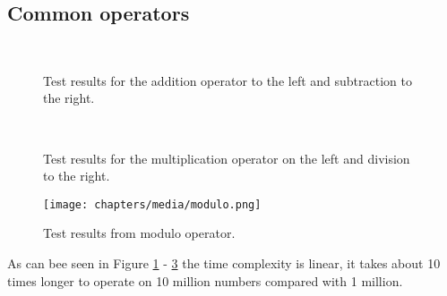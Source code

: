 \subsection{Common operators}

\begin{figure}[h]
\centering
\mbox{
}
\caption{Test results for the addition operator to the left and subtraction to the right.}
\label{fig:addition_subtraction}
\end{figure}

\begin{figure}[h]
\centering
\mbox{
}
\caption{Test results for the multiplication operator on the left and division to the right.}
\label{fig:multiplication_division}
\end{figure}

\begin{figure}[h]
	\centering
	\texttt{[image: chapters/media/modulo.png]}
	\caption{Test results from modulo operator.}
	\label{fig:modulo}
\end{figure}

As can bee seen in Figure \ref{fig:addition_subtraction} - \ref{fig:modulo} the time complexity is linear, it takes about 10 times longer to operate on 10 million numbers compared with 1 million.  
